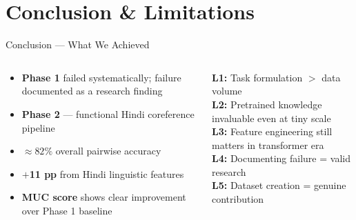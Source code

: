 \documentclass[aspectratio=169]{beamer}
\begin{document}
\section{Conclusion \& Limitations}

\begin{frame}{Conclusion — What We Achieved}
  \begin{columns}[T]
      \begin{tcolorbox}[nbox={Results Summary}]
        \small
        \begin{itemize}\setlength\itemsep{4pt}
          \item \textbf{Phase 1} failed systematically;
                failure documented as a research finding
          \item \textbf{Phase 2} — functional Hindi
                coreference pipeline
          \item \textbf{${\approx}82\%$} overall pairwise accuracy
          \item \textbf{$+$11 pp} from Hindi linguistic features
          \item \textbf{MUC score} shows clear improvement
                over Phase 1 baseline
        \end{itemize}
      \end{tcolorbox}

      \vspace{6pt}
      \begin{tcolorbox}[rbox={Lessons Learned}]
        \small
        \textbf{L1:} Task formulation $>$ data volume\\[2pt]
        \textbf{L2:} Pretrained knowledge invaluable even at tiny scale\\[2pt]
        \textbf{L3:} Feature engineering still matters in transformer era\\[2pt]
        \textbf{L4:} Documenting failure = valid research\\[2pt]
        \textbf{L5:} Dataset creation = genuine contribution
      \end{tcolorbox}


\end{columns}
\end{frame}
\end{document}
